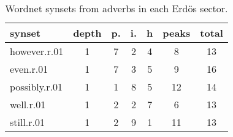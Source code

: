 \begin{table}[h!]
\begin{center}
\begin{tabular}{| l || c | c | c | c || c | c |}\hline
{\bf synset} & {\bf depth} & {\bf p.} & {\bf i.} & {\bf h} & {\bf peaks} & {\bf total} \\\hline\hline
however.r.01 & 1  & 7  & 2  & 4  & 8  & 13 \\
even.r.01 & 1  & 7  & 3  & 5  & 9  & 16 \\
possibly.r.01 & 1  & 1  & 8  & 5  & 12  & 14 \\
well.r.01 & 1  & 2  & 2  & 7  & 6  & 13 \\
still.r.01 & 1  & 2  & 9  & 1  & 11  & 13 \\\hline
\end{tabular}
\caption{Wordnet synsets from adverbs in each Erd\"os sector.}
\end{center}
\end{table}